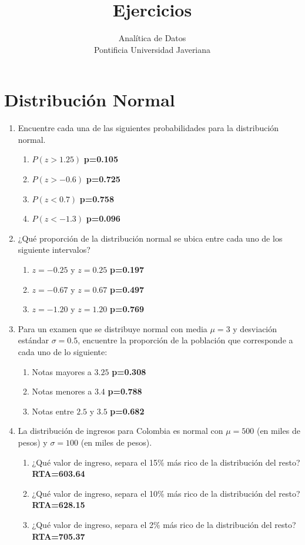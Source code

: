 \documentclass[letterpaper]{article}
\begin{document}
\title{{\bf Ejercicios}} 
\author{Analítica de Datos  \\
	Pontificia Universidad Javeriana}

\date{}

\maketitle


\section{Distribución Normal}
\begin{enumerate}
	\item Encuentre cada una de las siguientes probabilidades para la distribución normal.
	\begin{enumerate}
		\item $P(z>1.25)$ {\bf p=0.105}
		\item $P(z>-0.6)$ {\bf p=0.725}
		\item $P(z<0.7)$ {\bf p=0.758}
		\item $P(z<-1.3)$ {\bf p=0.096}
	\end{enumerate}
	
	\item ¿Qué proporción de la distribución normal se ubica entre cada uno de los siguiente intervalos?
	\begin{enumerate}
		\item $z= -0.25$ y $z=0.25$  {\bf p=0.197}
		\item $z=-0.67$ y $z=0.67$  {\bf p=0.497}
		\item $z= -1.20$ y $z=1.20$  {\bf p=0.769}
	\end{enumerate}
	
	\item Para un examen que se distribuye normal con media $\mu=3$ y desviación estándar $\sigma=0.5$, encuentre la proporción de la población que corresponde a cada uno de lo siguiente:
	\begin{enumerate}
		\item Notas mayores a $3.25$ {\bf p=0.308}
		\item Notas menores a $3.4$ {\bf p=0.788}
		\item Notas entre $2.5$ y $3.5$ {\bf p=0.682}
	\end{enumerate}
	
	\item La distribución de ingresos para Colombia es normal con $\mu=500$ (en miles de pesos) y $\sigma=100$ (en miles de pesos).
	\begin{enumerate}
		\item ¿Qué valor de ingreso, separa el 15\% más rico de la distribución del resto? {\bf RTA=603.64}
		\item ¿Qué valor de ingreso, separa el 10\% más rico de la distribución del resto? {\bf RTA=628.15}
		\item ¿Qué valor de ingreso, separa el 2\% más rico de la distribución del resto? {\bf RTA=705.37}
	\end{enumerate}


\end{enumerate}
\end{document}
